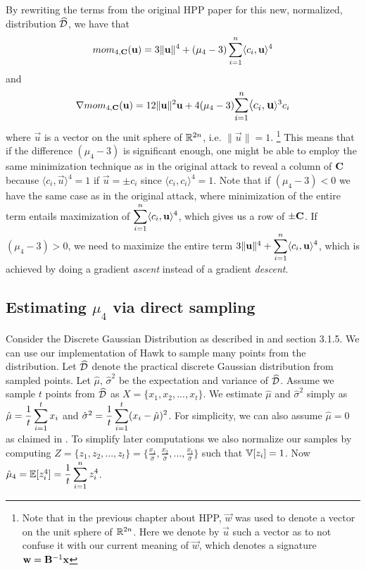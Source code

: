 By rewriting the terms from the original HPP paper \cite{NR09} for this new, normalized, distribution $\widehat{\mathcal{D}}$, we have that
\[mom_{4, \mathbf{C}} (\mathbf{u}) = 3 \lVert \mathbf{u} \rVert ^4 + (\mu_4 - 3) \sum_{i=1}^{n} \langle c_i, \mathbf{u} \rangle^4 \]
and
\[\nabla mom_{4, \mat{C}} (\vec{u}) = 12 \lVert \vec{u} \rVert^2 \vec{u} + 4(\mu_4 - 3) \mathlarger{\sum_{i=1}^{n} \langle c_i, \vec{u}} \rangle^3 c_i\]
where $\vec{u}$ is a vector on the unit sphere of $\mathbb{R}^{2n}$, i.e. $\lVert \vec{u} \rVert = 1$. \footnote{Note that in the previous chapter about HPP, $\vec{w}$ was used to denote a vector on the unit sphere of $\mathbb{R}^{2n}$.
Here we denote by $\vec{u}$ such a vector as to not confuse it with our current meaning of $\vec{w}$, which denotes a signature $\mathbf{w} = \mathbf{B}^{-1} \mathbf{x}$}
This means that if the difference $(\mu_4 - 3)$ is significant enough, one might be able to employ the same minimization technique as in the original attack to reveal a column of $\mathbf{C}$ 
because $\langle c_i, \vec{u} \rangle^4 = 1$ if $\vec{u} = \pm c_i$ since $\langle c_i, c_i \rangle^4 = 1$.
Note that if $(\mu_4 - 3) < 0$ we have the same case as in the original attack, where minimization of the entire term entails maximization of $\mathlarger{\sum_{i=1}^{n} \langle c_i, \vec{u} \rangle^4}$, which gives us a row of $\pm \mathbf{C}$.
If $(\mu_4 - 3) > 0$, we need to maximize the entire term $3 \lVert \vec{u} \rVert ^4 + \mathlarger{\sum_{i=1}^{n} \langle c_i, \vec{u} \rangle^4}$, which is achieved by doing a gradient \textit{ascent} instead of a gradient \textit{descent}.

\subsection{Estimating $\mu_4$ via direct sampling}
Consider the Discrete Gaussian Distribution as described in \cite{HawkSpec24} and section 3.1.5. We can use our implementation of Hawk to sample many points from the distribution.
Let $\widehat{\mathcal{D}}$ denote the practical discrete Gaussian distribution from sampled points.
Let $\hat{\mu}$, $\hat{\sigma}^2$ be the expectation and variance of $\widehat{\mathcal{D}}$.
Assume we sample $t$ points from $\widehat{\mathcal{D}}$ as $X = \{x_1, x_2, ..., x_t\}$. We estimate $\hat{\mu}$ and $\hat{\sigma}^2$ simply as $\hat{\mu} = \mathlarger{\frac{1}{t} \sum_{i=1}^{t} x_i}$ and $\hat{\sigma}^2 = \mathlarger{\frac{1}{t} \sum_{i=1}^{t}(x_i - \hat{\mu})^2}$.
For simplicity, we can also assume $\hat{\mu} = 0$ as claimed in \cite{HawkSpec24}.
To simplify later computations we also normalize our samples by computing $Z = \{z_1, z_2, ..., z_t\} = \{\frac{x_1}{\hat{\sigma}}, \frac{x_2}{\hat{\sigma}},..., \frac{x_t}{\hat{\sigma}}\}$ such that 
$\mathbb{V}[z_i] = 1$.
Now $\hat{\mu}_4 = \bb{E}[z_i^4] = \mathlarger{\frac{1}{t} \sum_{i=1}^{n} z_i ^4}$. 


